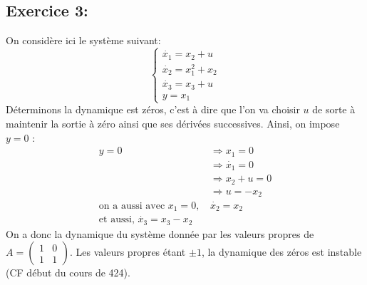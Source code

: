 \documentclass{../../td}{subfiles}
\begin{document}
\subsection*{Exercice 3:}
On considère ici le système suivant:
\[\left\{\begin{matrix}
\dot{x_1} = x_2 + u\\
\dot{x_2} = x_1^2 + x_2\\
\dot{x_3} = x_3 + u \\
y = x_1
\end{matrix} \right. \]
Déterminons la dynamique est zéros, c'est à dire que l'on va choisir $u$ de sorte à maintenir la sortie à zéro ainsi que ses dérivées successives.
Ainsi, on impose $y=0$ :
\begin{align*}
y = 0 &\Rightarrow x_1 = 0\\
&\Rightarrow \dot{x_1} = 0\\
&\Rightarrow x_2 + u = 0\\
&\Rightarrow u = -x_2\\
\text{on a aussi avec $x_1 = 0$, } &\dot{x_2} = x_2\\ 
\text{et aussi, } \dot{x_3} = x_3 - x_2
\end{align*}
On a donc la dynamique du système donnée par les valeurs propres de $ A = \begin{pmatrix}1 & 0 \\ 1 & 1\end{pmatrix}$. Les valeurs propres étant $\pm 1$, la dynamique des zéros est instable (CF début du cours de 424).
\end{document}
